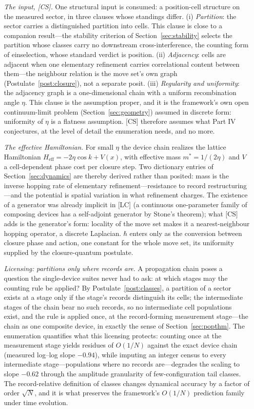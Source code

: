 \documentclass[11pt]{article}
\theoremstyle{definition}
\theoremstyle{remark}
\begin{document}
\emph{The input, [CS].} One structural input is consumed: a position-cell structure on the measured sector, in three clauses whose standings differ. (i) \emph{Partition}: the sector carries a distinguished partition into cells. This clause is close to a companion result---the stability criterion of Section~\ref{sec:stability} selects the partition whose classes carry no downstream cross-interference, the counting form of einselection, whose standard verdict is position. (ii) \emph{Adjacency}: cells are adjacent when one elementary refinement carries correlational content between them---the neighbour relation is the move set's own graph (Postulate~\ref{post:closure}), not a separate posit. (iii) \emph{Regularity and uniformity}: the adjacency graph is a one-dimensional chain with a uniform recombination angle $\eta$. This clause is the assumption proper, and it is the framework's own open continuum-limit problem (Section~\ref{sec:geometry}) assumed in discrete form: uniformity of $\eta$ is a flatness assumption. [CS] therefore assumes what Part IV conjectures, at the level of detail the enumeration needs, and no more.

\emph{The effective Hamiltonian.} For small $\eta$ the device chain realizes the lattice Hamiltonian $H_{\mathrm{eff}} = -2\eta\cos k + V(x)$, with effective mass $m^\ast = 1/(2\eta)$ and $V$ a cell-dependent phase cost per closure step. Two dictionary entries of Section~\ref{sec:dynamics} are thereby derived rather than posited: mass is the inverse hopping rate of elementary refinement---resistance to record restructuring---and the potential is spatial variation in what refinement charges. The existence of a generator was already implicit in [LC] (a continuous one-parameter family of composing devices has a self-adjoint generator by Stone's theorem); what [CS] adds is the generator's form: locality of the move set makes it a nearest-neighbour hopping operator, a discrete Laplacian. $\hbar$ enters only as the conversion between closure phase and action, one constant for the whole move set, its uniformity supplied by the closure-quantum postulate.

\emph{Licensing: partitions only where records are.} A propagation chain poses a question the single-device suites never had to ask: at which stages may the counting rule be applied? By Postulate~\ref{post:classes}, a partition of a sector exists at a stage only if the stage's records distinguish its cells; the intermediate stages of the chain bear no such records, so no intermediate cell populations exist, and the rule is applied once, at the record-forming measurement stage---the chain as one composite device, in exactly the sense of Section~\ref{sec:popthm}. The enumeration quantifies what this licensing protects: counting once at the measurement stage yields residues of $O(1/N)$ against the exact device chain (measured log--log slope $-0.94$), while imputing an integer census to every intermediate stage---populations where no records are---degrades the scaling to slope $-0.62$ through the amplitude granularity of few-configuration tail classes. The record-relative definition of classes changes dynamical accuracy by a factor of order $\sqrt{N}$, and it is what preserves the framework's $O(1/N)$ prediction family under time evolution.
\end{document}
